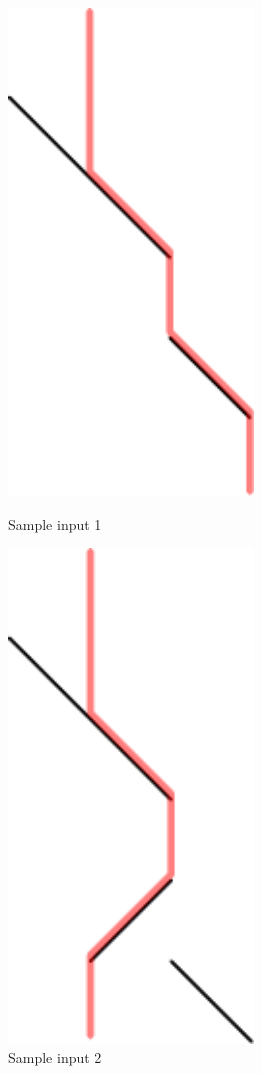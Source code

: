 \begin{figure}[h]
  \centering
  \begin{minipage}{0.3\textwidth}
  \centering
    \includegraphics[width=0.58\textwidth]{sample}
    \caption{Sample input 1}
    \label{fig:sample}
  \end{minipage}
  \begin{minipage}{0.3\textwidth}
  \centering
    \includegraphics[width=0.58\textwidth]{sample2}
    \caption{Sample input 2}
    \label{fig:sample2}
  \end{minipage}
\end{figure}
